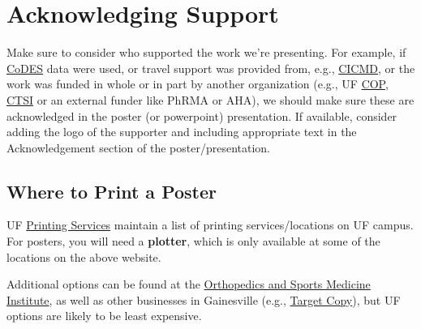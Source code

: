 \documentclass[
  letterpaper,
  DIV=11,
  numbers=noendperiod]{scrreprt}
\begin{document}
\begin{tcolorbox}[enhanced jigsaw, colframe=quarto-callout-note-color-frame, opacityback=0, leftrule=.75mm, bottomrule=.15mm, rightrule=.15mm, left=2mm, toptitle=1mm, colback=white, bottomtitle=1mm, titlerule=0mm, title=\textcolor{quarto-callout-note-color}{\faInfo}\hspace{0.5em}{Note}, arc=.35mm, toprule=.15mm, breakable, coltitle=black, colbacktitle=quarto-callout-note-color!10!white, opacitybacktitle=0.6]


\hypertarget{acknowledging-support}{%
\chapter{Acknowledging Support}\label{acknowledging-support}}

Make sure to consider who supported the work we're presenting. For
example, if \href{https://codes.pharmacy.ufl.edu/}{CoDES} data were
used, or travel support was provided from, e.g.,
\href{https://cicmd.center.ufl.edu/}{CICMD}, or the work was funded in
whole or in part by another organization (e.g., UF
\href{https://pharmacy.ufl.edu/}{COP},
\href{https://www.ctsi.ufl.edu}{CTSI} or an external funder like PhRMA
or AHA), we should make sure these are acknowledged in the poster (or
powerpoint) presentation. If available, consider adding the logo of the
supporter and including appropriate text in the Acknowledgement section
of the poster/presentation.

\end{tcolorbox}

\hypertarget{where-to-print-a-poster}{%
\section{Where to Print a Poster}\label{where-to-print-a-poster}}

UF \href{https://print.at.ufl.edu/help/printing-locations/}{Printing
Services} maintain a list of printing services/locations on UF campus.
For posters, you will need a \textbf{plotter}, which is only available
at some of the locations on the above website.

Additional options can be found at the
\href{https://www.ortho.ufl.edu/poster-service}{Orthopedics and Sports
Medicine Institute}, as well as other businesses in Gainesville (e.g.,
\href{https://target-copy.com/}{Target Copy}), but UF options are likely
to be least expensive.
\end{document}
